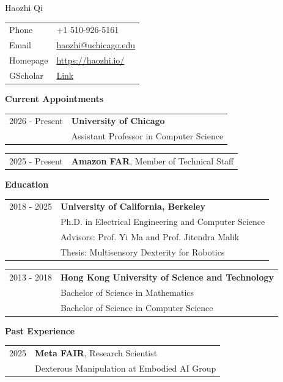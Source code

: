 \documentclass{resume}
\newlength{\myvertspace}
\newcommand{\vs}{ \vspace{\myvertspace} }
\begin{document}
{\Huge Haozhi Qi}

{\renewcommand{\arraystretch}{1.1}
\begin{tabular}{@{}L{2.1cm}l@{}}
{Phone} & {+1 510-926-5161} \\
{Email} & {\href{mailto:haozhi@uchicago.edu}{haozhi@uchicago.edu}} \\
{Homepage} & {\href{https://haozhi.io/}{https://haozhi.io/}} \\
{GScholar} & {\href{https://scholar.google.com/citations?user=iyVHKkcAAAAJ&hl=en}{Link}}
\end{tabular}}

\vs
{\bf \large Current Appointments}
\vs

{\renewcommand{\arraystretch}{1.1}
\begin{tabular}{@{}L{2.1cm}l@{}}
{2026 - Present} & {\bf University of Chicago} \\
& {Assistant Professor in Computer Science}
\end{tabular}}

{\renewcommand{\arraystretch}{1.1}
\begin{tabular}{@{}L{2.1cm}l@{}}
{2025 - Present} & {\bf Amazon FAR}, Member of Technical Staff \\
\end{tabular}}

\vs
{\bf \large Education}
\vs

{\renewcommand{\arraystretch}{1.1}
\begin{tabular}{@{}L{2.1cm}l@{}}
{2018 - 2025} & {\bf University of California, Berkeley} \\
& {Ph.D. in Electrical Engineering and Computer Science} \\
& {Advisors: Prof. Yi Ma and Prof. Jitendra Malik} \\
& {Thesis: Multisensory Dexterity for Robotics}
\end{tabular}}

{\renewcommand{\arraystretch}{1.1}
\begin{tabular}{@{}L{2.1cm}l@{}}
{2013 - 2018} & {\bf Hong Kong University of Science and Technology} \\
& {Bachelor of Science in Mathematics} \\
& {Bachelor of Science in Computer Science}
\end{tabular}}

\vs
{\bf \large Past Experience}
\vs

{\renewcommand{\arraystretch}{1.1}
\begin{tabular}{@{}L{2.1cm}l@{}}
{2025} & {\bf Meta FAIR}, Research Scientist \\
& {Dexterous Manipulation at Embodied AI Group} \\
\end{tabular}}
\end{document}
